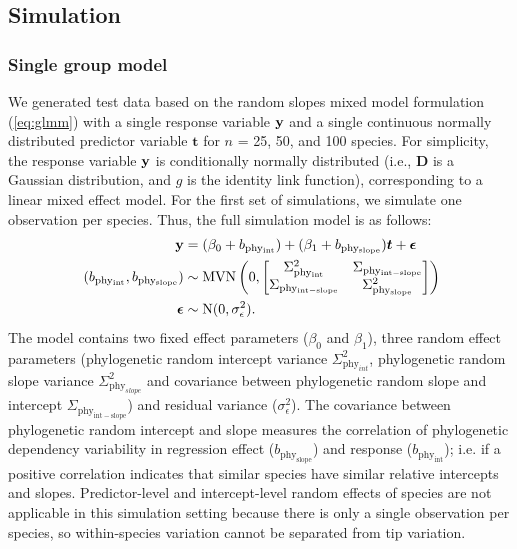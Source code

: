 \documentclass[12pt]{article}
\begin{document}
\subsection*{Simulation}
\subsubsection*{Single group model}

We generated test data based on the random slopes mixed model formulation (\ref{eq:glmm}) with a single response variable ${\mathbf y}$ and a single continuous normally distributed predictor variable $\bm{t}$ for $n$ = 25, 50, and 100 species.
For simplicity, the response variable ${\mathbf y}$ is conditionally normally distributed (i.e., $\bm{D}$ is a Gaussian distribution, and $g$ is the identity link function), corresponding to a linear mixed effect model. 
For the first set of simulations, we simulate one observation per species.
Thus, the full simulation model is as follows:
\begin{equation}
\begin{aligned}
{\mathbf y} & = (\beta_0 + b_{\mathrm{phy_{int}}}) + (\beta_1 + b_{\mathrm{phy_{slope}}}) \bm{t} + {\boldsymbol \epsilon} \\\
(b_{\mathrm{phy_{int}}}, b_{\mathrm{phy_{slope}}}) & \sim \textrm{MVN} \left( 0, \begin{bmatrix}
\Sigma^2_{\mathrm{phy_{int}}} & \Sigma_{\mathrm{phy_{int-slope}}} \\ 
\Sigma_{\mathrm{phy_{int-slope}}} & \Sigma^2_{\mathrm{phy_{slope}}}
\end{bmatrix} 
\right) \\ 
{\boldsymbol \epsilon} & \sim \textrm{N} ( 0 , \sigma_{\epsilon}^2) .
\label{eq:single_glmm}
\end{aligned}
\end{equation}
The model contains two fixed effect parameters ($\beta_0$ and $\beta_1$), three random effect parameters (phylogenetic random intercept variance $\Sigma^2_{\mathrm{phy}_{int}}$, phylogenetic random slope variance $\Sigma^2_{\mathrm{phy}_{slope}}$ and covariance between phylogenetic random slope and intercept $\Sigma_{\mathrm{phy_{int-slope}}}$) and residual variance ($\sigma_{\epsilon}^2$).  
The covariance between phylogenetic random intercept and slope measures the correlation of phylogenetic dependency variability in regression effect ($b_{\mathrm{phy_{slope}}}$) and response ($b_{\mathrm{phy_{int}}}$); i.e. if a positive correlation indicates that similar species have similar relative intercepts and slopes.
Predictor-level and intercept-level random effects of species are not applicable in this simulation setting because there is only a single observation per species, so within-species variation cannot be separated from tip variation.
\end{document}
